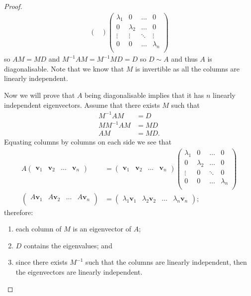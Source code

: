 \begin{proof}
\begin{align*}
\begin{pmatrix}
        \end{pmatrix}
        \begin{pmatrix}
            \lambda_1 & 0 & \ldots & 0 \\
            0 & \lambda_2 & \ldots & 0 \\
            \vdots & \vdots & \ddots & \vdots \\
            0 & 0 & \ldots & \lambda_n \\
        \end{pmatrix}
    \end{align*}
    so $AM = MD$ and $M^{-1} A M = M^{-1} M D = D$ so $D \sim A$ and thus $A$ is diagonalisable. Note that we know that $M$ is invertible as all the columns are linearly independent.

    Now we will prove that $A$ being diagonalisable implies that it has $n$ linearly independent eigenvectors. Assume that there exists $M$ such that
    \begin{align*}
        M^{-1} A M &= D \\
        M M^{-1} A M &= M D \\
        AM &= MD.
    \end{align*}
    Equating columns by columns on each side we see that
    \begin{align*}
        A
        \begin{pmatrix}
            \bm{v}_1 & \bm{v}_2 & \ldots & \bm{v}_n
        \end{pmatrix}
        &=
        \begin{pmatrix}
            \bm{v}_1 & \bm{v}_2 & \ldots & \bm{v}_n
        \end{pmatrix}
        \begin{pmatrix}
            \lambda_1 & 0 & \ldots & 0 \\
            0 & \lambda_2 & \ldots & 0 \\
            \vdots & 0 & \ddots & 0 \\
            0 & 0 & \ldots & \lambda_n \\
        \end{pmatrix}
        \\
        \begin{pmatrix}
            A \bm{v}_1 & A \bm{v}_2 & \ldots & A \bm{v}_n \\
        \end{pmatrix}
        &=
        \begin{pmatrix}
            \lambda_1 \bm{v}_1 & \lambda_2 \bm{v}_2 & \ldots & \lambda_n \bm{v}_n 
        \end{pmatrix}
        ;
    \end{align*}
    therefore:
    \begin{enumerate}
        \item each column of $M$ is an eigenvector of $A$;
        \item $D$ contains the eigenvalues; and
        \item since there exists $M^{-1}$ such that the columns are linearly independent, then the eigenvectors are linearly independent.
    \end{enumerate}
\end{proof}


